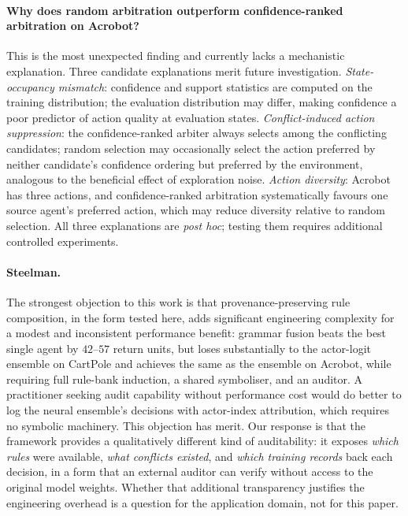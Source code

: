 \documentclass[12pt]{article}
\begin{document}
\paragraph{Why does random arbitration outperform confidence-ranked
arbitration on Acrobot?}
This is the most unexpected finding and currently lacks a mechanistic
explanation.
Three candidate explanations merit future investigation.
\emph{State-occupancy mismatch}: confidence and support statistics are
computed on the training distribution; the evaluation distribution may
differ, making confidence a poor predictor of action quality at evaluation
states.
\emph{Conflict-induced action suppression}: the confidence-ranked arbiter
always selects among the conflicting candidates; random selection may
occasionally select the action preferred by neither candidate's confidence
ordering but preferred by the environment, analogous to the beneficial
effect of exploration noise.
\emph{Action diversity}: Acrobot has three actions, and confidence-ranked
arbitration systematically favours one source agent's preferred action,
which may reduce diversity relative to random selection.
All three explanations are \emph{post hoc}; testing them requires
additional controlled experiments.

\paragraph{Steelman.}
The strongest objection to this work is that provenance-preserving
rule composition, in the form tested here, adds significant engineering
complexity for a modest and inconsistent performance benefit:
grammar fusion beats the best single agent by $42$--$57$ return units,
but loses substantially to the actor-logit ensemble on CartPole and
achieves the same as the ensemble on Acrobot, while requiring full
rule-bank induction, a shared symboliser, and an auditor.
A practitioner seeking audit capability without performance cost would
do better to log the neural ensemble's decisions with actor-index
attribution, which requires no symbolic machinery.
This objection has merit.
Our response is that the framework provides a qualitatively different
kind of auditability: it exposes \emph{which rules} were available,
\emph{what conflicts existed}, and \emph{which training records} back
each decision, in a form that an external auditor can verify without
access to the original model weights.
Whether that additional transparency justifies the engineering overhead
is a question for the application domain, not for this paper.
\end{document}
